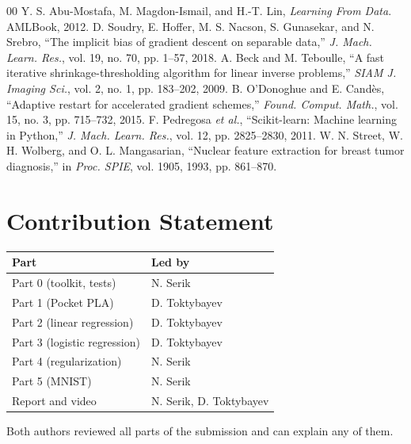 \documentclass[conference]{IEEEtran}
\begin{document}
\clearpage
\begin{thebibliography}{00}
 Y. S. Abu-Mostafa, M. Magdon-Ismail, and H.-T. Lin, \textit{Learning From Data}. AMLBook, 2012.
 D. Soudry, E. Hoffer, M. S. Nacson, S. Gunasekar, and N. Srebro, ``The implicit bias of gradient descent on separable data,'' \textit{J. Mach. Learn. Res.}, vol. 19, no. 70, pp. 1--57, 2018.
 A. Beck and M. Teboulle, ``A fast iterative shrinkage-thresholding algorithm for linear inverse problems,'' \textit{SIAM J. Imaging Sci.}, vol. 2, no. 1, pp. 183--202, 2009.
 B. O'Donoghue and E. Cand\`es, ``Adaptive restart for accelerated gradient schemes,'' \textit{Found. Comput. Math.}, vol. 15, no. 3, pp. 715--732, 2015.
 F. Pedregosa \textit{et al.}, ``Scikit-learn: Machine learning in Python,'' \textit{J. Mach. Learn. Res.}, vol. 12, pp. 2825--2830, 2011.
 W. N. Street, W. H. Wolberg, and O. L. Mangasarian, ``Nuclear feature extraction for breast tumor diagnosis,'' in \textit{Proc. SPIE}, vol. 1905, 1993, pp. 861--870.
\end{thebibliography}

\section*{Contribution Statement}
\begin{center}\footnotesize
\begin{tabular}{p{}p{}}
\toprule
Part & Led by\\
\midrule
Part 0 (toolkit, tests) & N. Serik\\
Part 1 (Pocket PLA) & D. Toktybayev\\
Part 2 (linear regression) & D. Toktybayev\\
Part 3 (logistic regression) & D. Toktybayev\\
Part 4 (regularization) & N. Serik\\
Part 5 (MNIST) & N. Serik\\
Report and video & N. Serik, D. Toktybayev\\
\bottomrule
\end{tabular}
\end{center}
Both authors reviewed all parts of the submission and can explain any of them.
\end{document}
